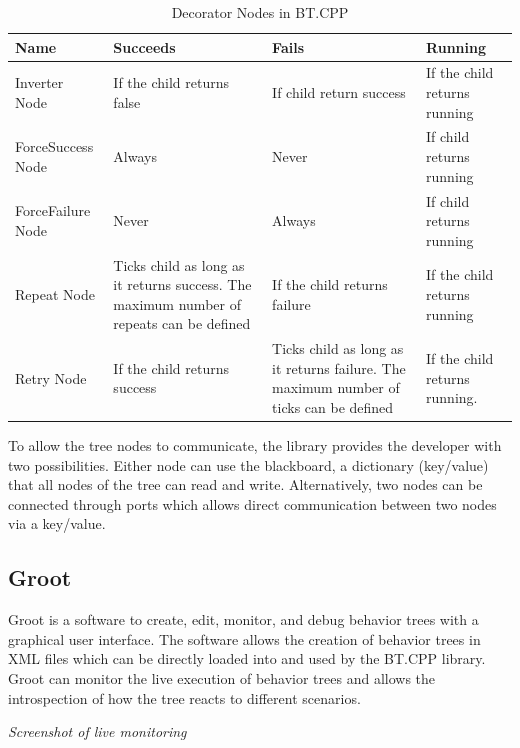 \begin{table}[h!]
	\caption{Decorator Nodes in BT.CPP}
	\begin{tabular}{ | m{} | m{}| m{} | m{} |} 
  	\hline
  	Name & Succeeds & Fails & Running \\ 
  	\hline
  	Inverter Node & If the child returns false & If child return success &  If the child returns running \\ 
  	\hline
  	ForceSuccess Node & Always & Never & If child returns running \\ 
  	\hline
  	ForceFailure Node & Never & Always & If child returns running\\
  	\hline
  	Repeat Node & Ticks child as long as it returns success. The maximum number of repeats can be defined & If the child returns failure & If the child returns running \\
  	\hline  	
  	Retry Node & If the child returns success & Ticks child as long as it returns failure. The maximum number of ticks can be defined & If the child returns running. \\
  	\hline
	\end{tabular}
\end{table}

To allow the tree nodes to communicate, the library provides the developer with two possibilities. Either node can use the blackboard, a dictionary (key/value) that all nodes of the tree can read and write. Alternatively, two nodes can be connected through ports which allows direct communication between two nodes via a key/value.

\subsection{Groot}

Groot is a software to create, edit, monitor, and debug behavior trees with a graphical user interface. The software allows the creation of behavior trees in XML files which can be directly loaded into and used by the BT.CPP library. Groot can monitor the live execution of behavior trees and allows the introspection of how the tree reacts to different scenarios.

\textit{Screenshot of live monitoring}

